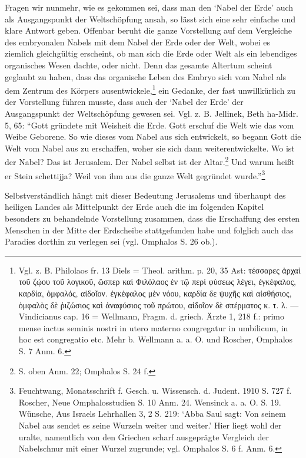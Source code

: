 \documentclass[a4paper, 11pt, oneside]{article}
\begin{document}
Fragen wir nunmehr, wie es gekommen sei, dass man den `Nabel der Erde' auch als Ausgangspunkt der Weltschöpfung ansah, so lässt sich eine sehr einfache und klare Antwort geben. Offenbar beruht die ganze Vorstellung auf dem Vergleiche des embryonalen Nabels mit dem Nabel der Erde oder der Welt, wobei es ziemlich gleichgültig erscheint, ob man sich die Erde oder Welt als ein lebendiges organisches Wesen dachte, oder nicht. Denn das gesamte Altertum scheint geglaubt zu haben, dass das organische Leben des Embryo sich vom Nabel als dem Zentrum des Körpers ausentwickele,\footnote{Vgl. z. B. Philolaos fr. 13 Diels = Theol. arithm. p. 20, 35 Ast: τέσσαρες ἀρχαὶ τοῦ ζῴου τοῦ λογικοῦ, ὥσπερ καὶ Φιλόλαος ἐν τῷ περὶ φύσεως λέγει, ἐγκέφαλος, καρδία, ὀμφαλός, αἰδοῖον. ἐγκέφαλος μὲν νόου, καρδία δε ψυχῆς καὶ αἰσθήσιος, ὀμφαλὸς δὲ ῥιζώσιος καὶ ἀναφύσιος τοῦ πρώτου, αἰδοῖον δὲ σπέρματος κ. τ. λ. --- Vindicianus cap. 16 = Wellmann, Fragm. d. griech. Ärzte 1, 218 f.: primo mense iactus seminis nostri in utero materno congregatur in umbilicum, in hoc est congregatio etc. Mehr b. Wellmann a. a. O. und Roscher, Omphalos S. 7 Anm. 6.} ein Gedanke, der fast unwillkürlich zu der Vorstellung führen musste, dass auch der `Nabel der Erde' der Ausgangspunkt der Weltschöpfung gewesen sei. Vgl. z. B. Jellinek, Beth ha-Midr. 5, 65: "`Gott gründete mit Weisheit die Erde. Gott erschuf die Welt wie das vom Weibe Geborene. So wie dieses vom Nabel aus sich entwickelt, so begann Gott die Welt vom Nabel aus zu erschaffen, woher sie sich dann weiterentwickelte. Wo ist der Nabel? Das ist Jerusalem. Der Nabel selbst ist der Altar.\footnote{S. oben Anm. 22; Omphalos S. 24 f.} Und warum heißt er Stein schettijja? Weil von ihm aus die ganze Welt gegründet wurde."'\footnote{Feuchtwang, Monatsschrift f. Gesch. u. Wissensch. d. Judent. 1910 S. 727 f. Roscher, Neue Omphalosstudien S. 10 Anm. 24. Wensinck a. a. O. S. 19. Wünsche, Aus Israels Lehrhallen 3, 2 S. 219: `Abba Saul sagt: Von seinem Nabel aus sendet es seine Wurzeln weiter und weiter.' Hier liegt wohl der uralte, namentlich von den Griechen scharf ausgeprägte Vergleich der Nabelschnur mit einer Wurzel zugrunde; vgl. Omphalos S. 6 f. Anm. 6.}

Selbstverständlich hängt mit dieser Bedeutung Jerusalems und überhaupt des heiligen Landes als Mittelpunkt der Erde auch die im folgenden Kapitel besonders zu behandelnde Vorstellung zusammen, dass die Erschaffung des ersten Menschen in der Mitte der Erdscheibe stattgefunden habe und folglich auch das Paradies dorthin zu verlegen sei (vgl. Omphalos S. 26 ob.).
\end{document}
